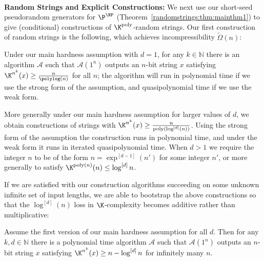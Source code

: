 ~\\
{\bf \noindent Random Strings and Explicit Constructions:} We next use our short-seed pseudorandom generators for $\P^{\NP} $ (Theorem~\ref{randomstrings:thm:mainthm1}) to give (conditional) constructions of $\K^{\poly}$-random strings. Our first construction of random strings is the following, which achieves incompressibility $\tilde{\Omega}(n)$:
\begin{theorem}
\label{randomstrings:thm:mainthm2}

Under our main hardness assumption with $d=1$, for any $k \in \mathbb{N}$ there is an algorithm $\mathcal{A}$ such that $\mathcal{A}(1^n)$ outputs an $n$-bit string $x$ satisfying $\K^{n^k}(x) \geq \frac{n}{\polylog(n)}$ for all $n$; the algorithm will run in polynomial time if we use the strong form of the assumption, and quasipolynomial time if we use the weak form.

More generally under our main hardness assumption for larger values of $d$, we obtain constructions of strings with $\K^{n^k}(x) \geq \frac{n}{\poly(\log^{[d]}(n))}$. Using the strong form of the assumption the construction runs in polynomial time, and under the weak form it runs in iterated quasipolynomial time. When $d > 1$ we require the integer $n$ to be of the form $n = \exp^{[d-1]}(n')$ for some integer $n'$, or more generally to satisfy $\K^{\poly(n)}(n) \leq \log^{[d]}n$.
\end{theorem}

If we are satisfied with our construction algorithms succeeding on some unknown infinite set of input lengths, we are able to bootstrap the above constructions so that the $\log^{[d]}(n)$ loss in $\K$-complexity becomes additive rather than multiplicative:
\begin{theorem}
\label{randomstrings:thm:mainthm3}

Assume the first version of our main hardness assumption for all $d$.
Then for any $k,d \in \mathbb{N}$ there is a polynomial time algorithm $\mathcal{A}$ such that $\mathcal{A}(1^n)$ outputs an $n$-bit string $x$ satisfying $\K^{n^k}(x) \geq n - \log^{[d]}n$ for infinitely many $n$.
\end{theorem}

